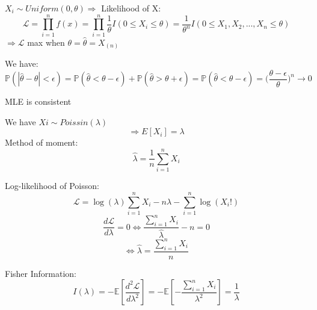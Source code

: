 \documentclass[10pt]{article}
\newenvironment{problem}[2][Problem]{\begin{trivlist}
\item[\hskip \labelsep {\bfseries #1}\hskip \labelsep {\bfseries #2.}]}{\end{trivlist}}
\begin{document}
\begin{problem}{4}


$X_i \sim Uniform(0, \theta) \Rightarrow$ Likelihood of X:
\[\mathcal{L}=\prod_{i=1}^{n}f(x)=\prod_{i=1}^{n}\frac{1}{\theta} I(0 \leq X_i \leq \theta )=\frac{1}{\theta ^n}I(0 \leq X_1, X_2,...,X_n \leq \theta)\]
$\Rightarrow \mathcal{L} $ max when $\theta= \hat{\theta}= X_{(n)}$ 

We have:
\[\mathbb{P}(|\hat{\theta}-\theta| < \epsilon) =\mathbb{P}(\hat{\theta}< \theta-\epsilon)+\mathbb{P}(\hat{\theta} > \theta + \epsilon)=\mathbb{P}(\hat{\theta} < \theta-\epsilon )=\big(\frac{\theta- \epsilon}{\theta}\big)^n \rightarrow 0\]

MLE is consistent




\end{problem}


\begin{problem}{5}
We have $Xi \sim Poissin(\lambda) $
\[ \Rightarrow E[X_i]= \lambda\]
Method of moment:
\[\hat{\lambda}= \frac{1}{n} \sum_{i=1}^{n} X_i\]

Log-likelihood of Poisson:
\[\mathcal{L}=\log(\lambda)\sum_{i=1}^{n} X_i- n\lambda-\sum_{i=1}^{n} \log(X_i!)\]
\[  \frac{d\mathcal{L}}{d\lambda}=0 \Leftrightarrow \frac{\sum_{
i=1}^{n}X_i}{\hat{\lambda}}-n =0\]
\[ \Leftrightarrow \hat{\lambda}= \frac{\sum_{i=1}^{n}X_i}{n}\]

Fisher Information:
\[I(\lambda)= -\mathbb{E}[\frac{d^2\mathcal{L}}{d\lambda^2}]=-\mathbb{E}[-\frac{\sum_{i=1}^{n} X_i}{\lambda ^2}]=\frac{1}{\lambda}\]
\end{problem}
\end{document}
